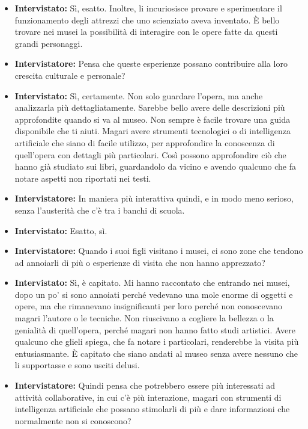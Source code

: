 \documentclass{article}
\begin{document}
\begin{itemize}
    \item \textbf{Intervistato:} Sì, esatto. Inoltre, li incuriosisce provare e sperimentare il funzionamento degli attrezzi che uno scienziato aveva inventato. È bello trovare nei musei la possibilità di interagire con le opere fatte da questi grandi personaggi.
    
    \item \textbf{Intervistatore:} Pensa che queste esperienze possano contribuire alla loro crescita culturale e personale?
    
    \item \textbf{Intervistato:} Sì, certamente. Non solo guardare l’opera, ma anche analizzarla più dettagliatamente. Sarebbe bello avere delle descrizioni più approfondite quando si va al museo. Non sempre è facile trovare una guida disponibile che ti aiuti. Magari avere strumenti tecnologici o di intelligenza artificiale che siano di facile utilizzo, per approfondire la conoscenza di quell’opera con dettagli più particolari. Così possono approfondire ciò che hanno già studiato sui libri, guardandolo da vicino e avendo qualcuno che fa notare aspetti non riportati nei testi.
    
    \item \textbf{Intervistatore:} In maniera più interattiva quindi, e in modo meno serioso, senza l’austerità che c’è tra i banchi di scuola.
    
    \item \textbf{Intervistato:} Esatto, sì.
    
    \item \textbf{Intervistatore:} Quando i suoi figli visitano i musei, ci sono zone che tendono ad annoiarli di più o esperienze di visita che non hanno apprezzato?
    
    \item \textbf{Intervistato:} Sì, è capitato. Mi hanno raccontato che entrando nei musei, dopo un po’ si sono annoiati perché vedevano una mole enorme di oggetti e opere, ma che rimanevano insignificanti per loro perché non conoscevano magari l’autore o le tecniche. Non riuscivano a cogliere la bellezza o la genialità di quell’opera, perché magari non hanno fatto studi artistici. Avere qualcuno che glieli spiega, che fa notare i particolari, renderebbe la visita più entusiasmante. È capitato che siano andati al museo senza avere nessuno che li supportasse e sono usciti delusi.
    
    \item \textbf{Intervistatore:} Quindi pensa che potrebbero essere più interessati ad attività collaborative, in cui c’è più interazione, magari con strumenti di intelligenza artificiale che possano stimolarli di più e dare informazioni che normalmente non si conoscono?
    

\end{itemize}
\end{document}
